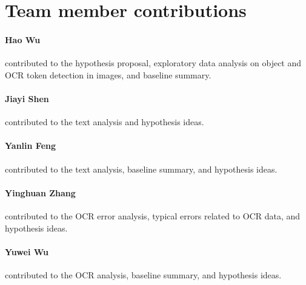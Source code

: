 \documentclass[11pt,a4paper]{article}
\begin{document}
\section{Team member contributions}
\paragraph{Hao Wu} contributed to the hypothesis proposal, exploratory data analysis on object and OCR token detection in images, and baseline summary.

\paragraph{Jiayi Shen} contributed to the text analysis and hypothesis ideas.

\paragraph{Yanlin Feng} contributed to the text analysis, baseline summary, and hypothesis ideas.

\paragraph{Yinghuan Zhang} contributed to the OCR error analysis, typical errors related to OCR data, and hypothesis ideas.

\paragraph{Yuwei Wu} contributed to the OCR analysis, baseline summary, and hypothesis ideas.


\clearpage



\end{document}
